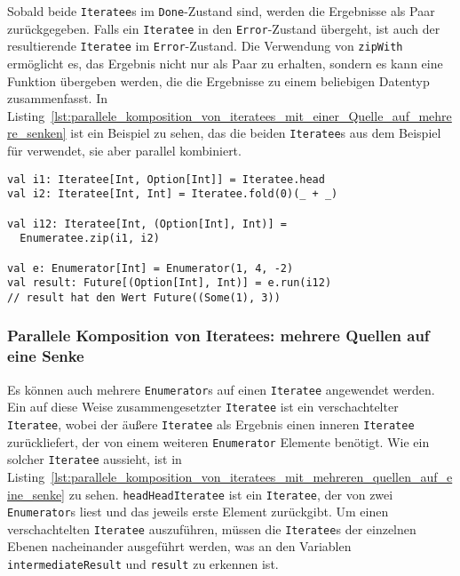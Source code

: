 Sobald beide \lstinline|Iteratee|s im \lstinline|Done|-Zustand sind, werden die Ergebnisse als Paar zurückgegeben.
Falls ein \lstinline|Iteratee| in den \lstinline|Error|-Zustand übergeht, ist auch der resultierende \lstinline|Iteratee| im \lstinline|Error|-Zustand.
Die Verwendung von \lstinline|zipWith| ermöglicht es, das Ergebnis nicht nur als Paar zu erhalten, sondern es kann eine Funktion übergeben werden, die die Ergebnisse zu einem beliebigen Datentyp zusammenfasst.
In Listing~\ref{lst:parallele_komposition_von_iteratees_mit_einer_Quelle_auf_mehrere_senken} ist ein Beispiel zu sehen, das die beiden \lstinline|Iteratee|s aus dem Beispiel für  verwendet, sie aber parallel kombiniert.

\begin{lstlisting}[caption=Parallele Komposition von Iteratees mit einer Quelle und mehreren Senken, label=lst:parallele_komposition_von_iteratees_mit_einer_Quelle_auf_mehrere_senken]
val i1: Iteratee[Int, Option[Int]] = Iteratee.head
val i2: Iteratee[Int, Int] = Iteratee.fold(0)(_ + _)

val i12: Iteratee[Int, (Option[Int], Int)] =
  Enumeratee.zip(i1, i2)

val e: Enumerator[Int] = Enumerator(1, 4, -2)
val result: Future[(Option[Int], Int)] = e.run(i12)
// result hat den Wert Future((Some(1), 3))
\end{lstlisting}


\subsubsection{Parallele Komposition von Iteratees: mehrere Quellen auf eine Senke} %
\label{ssub:anwendung_parallele_komposition_von_iteratees_mehrere_quellen}

Es können auch mehrere \lstinline|Enumerator|s auf einen \lstinline|Iteratee| angewendet werden.
Ein auf diese Weise zusammengesetzter \lstinline|Iteratee| ist ein verschachtelter \lstinline|Iteratee|, wobei der äußere \lstinline|Iteratee| als Ergebnis einen inneren \lstinline|Iteratee| zurückliefert, der von einem weiteren \lstinline|Enumerator| Elemente benötigt.
Wie ein solcher \lstinline|Iteratee| aussieht, ist in Listing~\ref{lst:parallele_komposition_von_iteratees_mit_mehreren_quellen_auf_eine_senke} zu sehen.
\lstinline|headHeadIteratee| ist ein \lstinline|Iteratee|, der von zwei \lstinline|Enumerator|s liest und das jeweils erste Element zurückgibt.
Um einen verschachtelten \lstinline|Iteratee| auszuführen, müssen die \lstinline|Iteratee|s der einzelnen Ebenen nacheinander ausgeführt werden, was an den Variablen \lstinline|intermediateResult| und \lstinline|result| zu erkennen ist.


